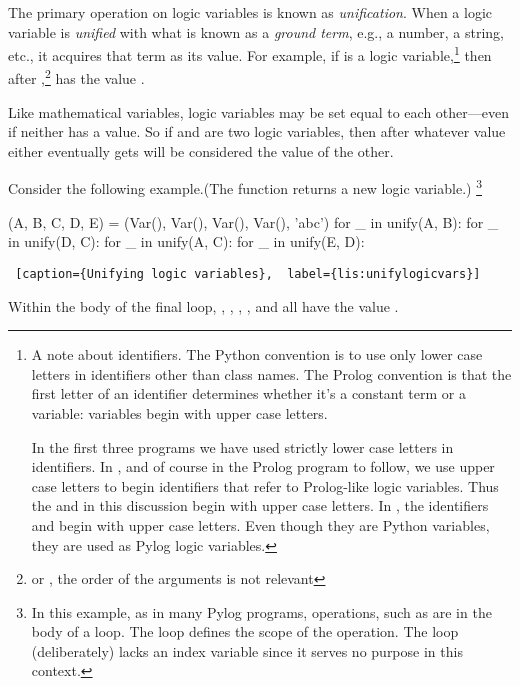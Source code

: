 The primary operation on logic variables is known as \textit{unification}. When a logic variable is \textit{unified} with what is known as a \textit{ground term}, e.g., a number, a string, etc., it acquires that term as its value. For example, if  is a logic variable,\footnote{A note about identifiers. The Python convention is to use only lower case letters in identifiers other than class names. The Prolog convention is that the first letter of an identifier determines whether it's a constant term or a variable: variables begin with upper case letters. 
\smallv
    
In the first three programs we have used strictly lower case letters in identifiers. In , and of course in the Prolog program to follow, we use upper case letters to begin identifiers that refer to Prolog-like logic variables. Thus the  and   in this discussion begin with upper case letters. In , the identifiers  and  begin with upper case letters. Even though they are Python variables, they are used as Pylog logic variables.} then after ,\footnote{or , the order of the arguments is not relevant}  has the value . 

Like mathematical variables, logic variables may be set equal to each other---even if neither has a value. So if  and  are two logic variables, then after  whatever value either eventually gets will be considered the value of the other. 

Consider the following example.(The function  returns a new logic variable.) \footnote{In this example, as in many Pylog programs, operations, such as  are in the body of a  loop. The  loop defines the scope of the operation.  The  loop (deliberately) lacks an index variable since it serves no purpose in this context.}

\smallv

\begin{minipage}{\linewidth} \largev   \hrulefill
\begin{python}
(A, B, C, D, E) = (Var(), Var(), Var(), Var(), 'abc')
for _ in unify(A, B):
  for _ in unify(D, C):
    for _ in unify(A, C):
      for _ in unify(E, D):
\end{python}
\begin{lstlisting} [caption={Unifying logic variables},  label={lis:unifylogicvars}]
\end{lstlisting}
\end{minipage}
Within the body of the final loop, , , , , and  all have the value .
\smallv

